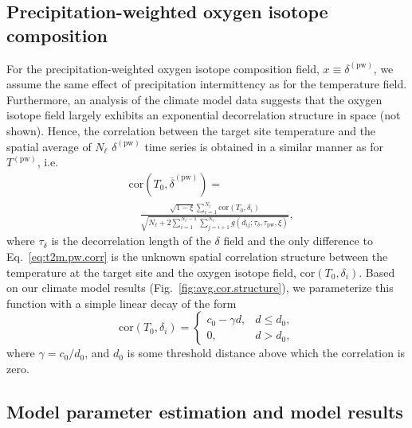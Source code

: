 \documentclass[cp]{copernicus}
\begin{document}
\subsection{Precipitation-weighted oxygen isotope composition}
\label{app:concept.model.oxy.pw}

For the precipitation-weighted oxygen isotope composition field, $x \equiv
\delta^{\mathrm{(pw)}}$, we assume the same effect of precipitation
intermittency as for the temperature field. Furthermore, an analysis of the
climate model data suggests that the oxygen isotope field largely exhibits an
exponential decorrelation structure in space (not shown). Hence, the correlation
between the target site temperature and the spatial average of $N_{\ell}$
$\delta^{\mathrm{(pw)}}$ time series is obtained in a similar manner as for
$T^{\mathrm{(pw)}}$, i.e.
%
\begin{equation}
\label{eq:oxy.pw.corr}
\begin{split}
&\mathrm{cor}\left(T_0,
  \overline{\delta}^{\mathrm{(pw)}}\right)=\\
&\quad\frac
{\sqrt{1-\xi}\sum_{i=1}^{N_{\ell}}\mathrm{cor}\left(T_0,\delta_i\right)}
{\sqrt{N_{\ell} + 2\sum_{i=1}^{N_{\ell}-1}\sum_{j=i+1}^{N_{\ell}}
  g\left(d_{ij}; \tau_{\delta}, \tau_{\mathrm{pw}}, \xi\right)}},
\end{split}
\end{equation}
%
where $\tau_{\delta}$ is the decorrelation length of the $\delta$ field and the
only difference to Eq.~\eqref{eq:t2m.pw.corr} is the unknown spatial correlation
structure between the temperature at the target site and the oxygen isotope
field, $\mathrm{cor}\left(T_0,\delta_i\right)$.  Based on our climate model
results (Fig.~\ref{fig:avg.cor.structure}), we parameterize this function with a
simple linear decay of the form
%
\begin{equation}
\label{eq:t2m.oxy.corr}
\mathrm{cor}\left(T_0,\delta_i\right)=
\begin{cases}
  c_0 - \gamma d, & d \le d_0,\\
  0, & d > d_0,
\end{cases}
\end{equation}
%
where $\gamma=c_0/d_0$, and $d_0$ is some threshold distance above which
the correlation is zero.

\subsection{Model parameter estimation and model results}
\label{app:concept.model.estimation}
\end{document}
